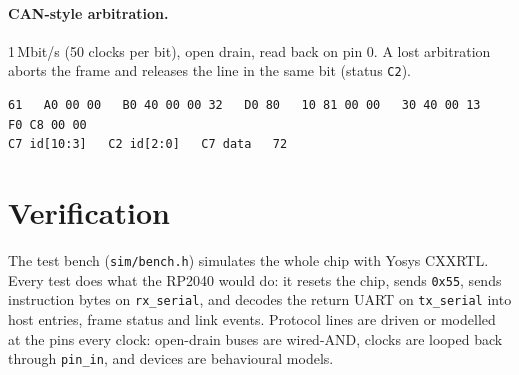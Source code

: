 \documentclass[11pt,a4paper]{article}
\newcommand{\sig}[1]{\texttt{#1}}
\begin{document}
\paragraph{CAN-style arbitration.} 1\,Mbit/s (50 clocks per bit), open drain, read back on pin 0. A lost arbitration aborts the frame and releases the line in the same bit (status \texttt{C2}).
\begin{lstlisting}
61   A0 00 00   B0 40 00 00 32   D0 80   10 81 00 00   30 40 00 13   F0 C8 00 00
C7 id[10:3]   C2 id[2:0]   C7 data   72
\end{lstlisting}


\section{Verification}\label{sec:verify}

The test bench (\sig{sim/bench.h}) simulates the whole chip with Yosys CXXRTL. Every test does what the RP2040 would do: it resets the chip, sends \texttt{0x55}, sends instruction bytes on \sig{rx\_serial}, and decodes the return UART on \sig{tx\_serial} into host entries, frame status and link events. Protocol lines are driven or modelled at the pins every clock: open-drain buses are wired-AND, clocks are looped back through \sig{pin\_in}, and devices are behavioural models.
\end{document}
